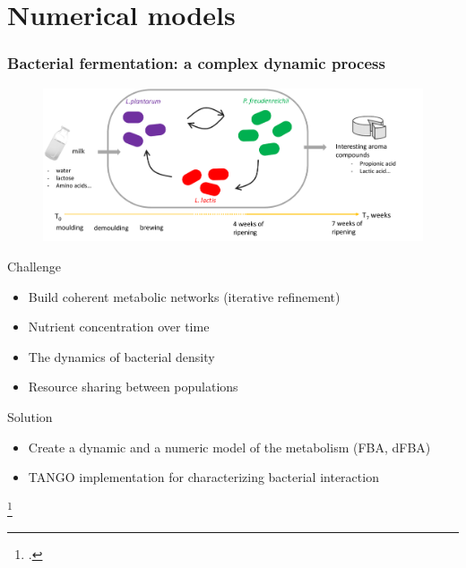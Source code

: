 \documentclass[8pt,usenames,dvipsnames]{beamer}
\begin{document}
\section{Numerical models}



\begin{frame}
\frametitle{Bacterial fermentation: a complex dynamic process}

\begin{figure}
\centering
\includegraphics[width=\textwidth]{figures/context-cheese}
\end{figure}

\begin{minipage}{0.5\textwidth}
\vspace{-0.3cm}
\begin{block}{Challenge}
\begin{itemize}
\item Build coherent metabolic networks (iterative refinement) %
\item Nutrient concentration over time %
\item The dynamics of bacterial density %
\item Resource sharing between populations %
\end{itemize}
\end{block}
\end{minipage}%
\hspace{0.2cm}
\hfill
\begin{minipage}{0.45\textwidth}
\vspace{-0.55cm}
\begin{alertblock}{Solution}
\begin{itemize}
\item Create a dynamic and a numeric model of the metabolism (FBA, dFBA) 
\item TANGO implementation for characterizing bacterial interaction
\end{itemize}
\end{alertblock}
\end{minipage}

\footcite{Orth2010,Mahadevan.2002} 



\end{frame}
\end{document}
